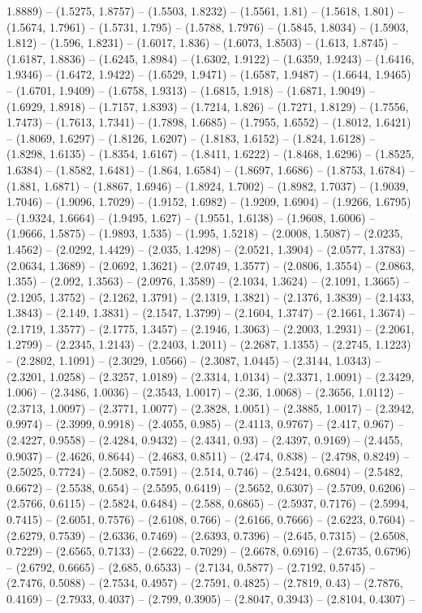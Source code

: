 1.8889) -- (1.5275, 1.8757) -- (1.5503, 1.8232) -- (1.5561, 1.81) -- (1.5618, 1.801) -- (1.5674, 1.7961) -- (1.5731, 1.795) -- (1.5788, 1.7976) -- (1.5845, 1.8034) -- (1.5903, 1.812) -- (1.596, 1.8231) -- (1.6017, 1.836) -- (1.6073, 1.8503) -- (1.613, 1.8745) -- (1.6187, 1.8836) -- (1.6245, 1.8984) -- (1.6302, 1.9122) -- (1.6359, 1.9243) -- (1.6416, 1.9346) -- (1.6472, 1.9422) -- (1.6529, 1.9471) -- (1.6587, 1.9487) -- (1.6644, 1.9465) -- (1.6701, 1.9409) -- (1.6758, 1.9313) -- (1.6815, 1.918) -- (1.6871, 1.9049) -- (1.6929, 1.8918) -- (1.7157, 1.8393) -- (1.7214, 1.826) -- (1.7271, 1.8129) -- (1.7556, 1.7473) -- (1.7613, 1.7341) -- (1.7898, 1.6685) -- (1.7955, 1.6552) -- (1.8012, 1.6421) -- (1.8069, 1.6297) -- (1.8126, 1.6207) -- (1.8183, 1.6152) -- (1.824, 1.6128) -- (1.8298, 1.6135) -- (1.8354, 1.6167) -- (1.8411, 1.6222) -- (1.8468, 1.6296) -- (1.8525, 1.6384) -- (1.8582, 1.6481) -- (1.864, 1.6584) -- (1.8697, 1.6686) -- (1.8753, 1.6784) -- (1.881, 1.6871) -- (1.8867, 1.6946) -- (1.8924, 1.7002) -- (1.8982, 1.7037) -- (1.9039, 1.7046) -- (1.9096, 1.7029) -- (1.9152, 1.6982) -- (1.9209, 1.6904) -- (1.9266, 1.6795) -- (1.9324, 1.6664) -- (1.9495, 1.627) -- (1.9551, 1.6138) -- (1.9608, 1.6006) -- (1.9666, 1.5875) -- (1.9893, 1.535) -- (1.995, 1.5218) -- (2.0008, 1.5087) -- (2.0235, 1.4562) -- (2.0292, 1.4429) -- (2.035, 1.4298) -- (2.0521, 1.3904) -- (2.0577, 1.3783) -- (2.0634, 1.3689) -- (2.0692, 1.3621) -- (2.0749, 1.3577) -- (2.0806, 1.3554) -- (2.0863, 1.355) -- (2.092, 1.3563) -- (2.0976, 1.3589) -- (2.1034, 1.3624) -- (2.1091, 1.3665) -- (2.1205, 1.3752) -- (2.1262, 1.3791) -- (2.1319, 1.3821) -- (2.1376, 1.3839) -- (2.1433, 1.3843) -- (2.149, 1.3831) -- (2.1547, 1.3799) -- (2.1604, 1.3747) -- (2.1661, 1.3674) -- (2.1719, 1.3577) -- (2.1775, 1.3457) -- (2.1946, 1.3063) -- (2.2003, 1.2931) -- (2.2061, 1.2799) -- (2.2345, 1.2143) -- (2.2403, 1.2011) -- (2.2687, 1.1355) -- (2.2745, 1.1223) -- (2.2802, 1.1091) -- (2.3029, 1.0566) -- (2.3087, 1.0445) -- (2.3144, 1.0343) -- (2.3201, 1.0258) -- (2.3257, 1.0189) -- (2.3314, 1.0134) -- (2.3371, 1.0091) -- (2.3429, 1.006) -- (2.3486, 1.0036) -- (2.3543, 1.0017) -- (2.36, 1.0068) -- (2.3656, 1.0112) -- (2.3713, 1.0097) -- (2.3771, 1.0077) -- (2.3828, 1.0051) -- (2.3885, 1.0017) -- (2.3942, 0.9974) -- (2.3999, 0.9918) -- (2.4055, 0.985) -- (2.4113, 0.9767) -- (2.417, 0.967) -- (2.4227, 0.9558) -- (2.4284, 0.9432) -- (2.4341, 0.93) -- (2.4397, 0.9169) -- (2.4455, 0.9037) -- (2.4626, 0.8644) -- (2.4683, 0.8511) -- (2.474, 0.838) -- (2.4798, 0.8249) -- (2.5025, 0.7724) -- (2.5082, 0.7591) -- (2.514, 0.746) -- (2.5424, 0.6804) -- (2.5482, 0.6672) -- (2.5538, 0.654) -- (2.5595, 0.6419) -- (2.5652, 0.6307) -- (2.5709, 0.6206) -- (2.5766, 0.6115) -- (2.5824, 0.6484) -- (2.588, 0.6865) -- (2.5937, 0.7176) -- (2.5994, 0.7415) -- (2.6051, 0.7576) -- (2.6108, 0.766) -- (2.6166, 0.7666) -- (2.6223, 0.7604) -- (2.6279, 0.7539) -- (2.6336, 0.7469) -- (2.6393, 0.7396) -- (2.645, 0.7315) -- (2.6508, 0.7229) -- (2.6565, 0.7133) -- (2.6622, 0.7029) -- (2.6678, 0.6916) -- (2.6735, 0.6796) -- (2.6792, 0.6665) -- (2.685, 0.6533) -- (2.7134, 0.5877) -- (2.7192, 0.5745) -- (2.7476, 0.5088) -- (2.7534, 0.4957) -- (2.7591, 0.4825) -- (2.7819, 0.43) -- (2.7876, 0.4169) -- (2.7933, 0.4037) -- (2.799, 0.3905) -- (2.8047, 0.3943) -- (2.8104, 0.4307) -- 